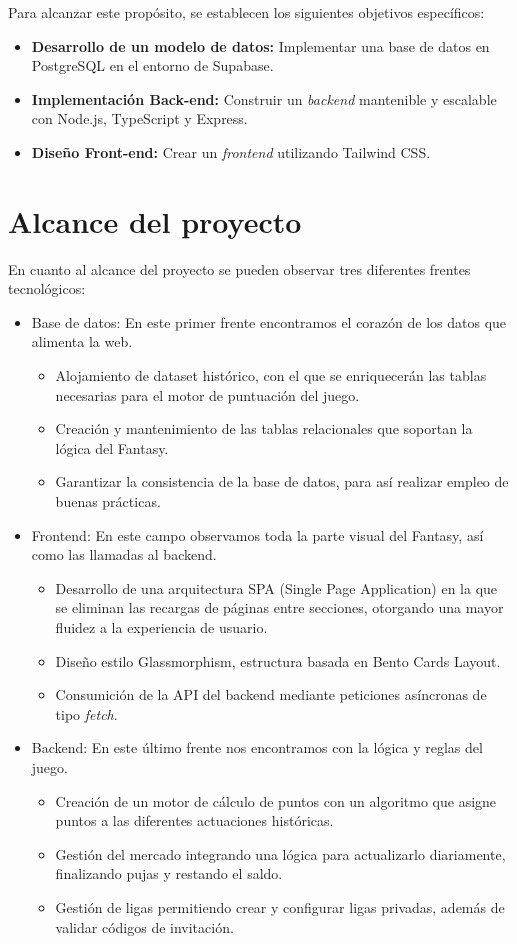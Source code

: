 Para alcanzar este propósito, se establecen los siguientes objetivos específicos:
\begin{itemize}
    \item \textbf{Desarrollo de un modelo de datos:} Implementar una base de datos en PostgreSQL en el entorno de Supabase.
    \item \textbf{Implementación Back-end:} Construir un \textit{backend} mantenible y escalable con Node.js, TypeScript y Express.
    \item \textbf{Diseño Front-end:} Crear un \textit{frontend} utilizando Tailwind CSS.
\end{itemize}
\section{Alcance del proyecto}
En cuanto al alcance del proyecto se pueden observar tres diferentes frentes tecnológicos:
\begin{itemize}
    \item Base de datos: En este primer frente encontramos el corazón de los datos que alimenta la web. 
    \begin{itemize}
        \item Alojamiento de dataset histórico, con el que se enriquecerán las tablas necesarias para el motor de puntuación del juego.
        \item Creación y mantenimiento de las tablas relacionales que soportan la lógica del Fantasy.
        \item Garantizar la consistencia de la base de datos, para así realizar empleo de buenas prácticas.
    \end{itemize}
    \item Frontend: En este campo observamos toda la parte visual del Fantasy, así como las llamadas al backend.
    \begin{itemize}
        \item Desarrollo de una arquitectura SPA (Single Page Application) en la que se eliminan las recargas de páginas entre secciones, otorgando una mayor fluidez a la experiencia de usuario.
        \item Diseño estilo Glassmorphism, estructura basada en Bento Cards Layout.
        \item Consumición de la API del backend mediante peticiones asíncronas de tipo \textit{fetch}.
    \end{itemize}
    \item Backend: En este último frente nos encontramos con la lógica y reglas del juego.
    \begin{itemize}
        \item Creación de un motor de cálculo de puntos con un algoritmo que asigne puntos a las diferentes actuaciones históricas.
        \item Gestión del mercado integrando una lógica para actualizarlo diariamente, finalizando pujas y restando el saldo.
        \item Gestión de ligas permitiendo crear y configurar ligas privadas, además de validar códigos de invitación.
    \end{itemize}
\end{itemize}
